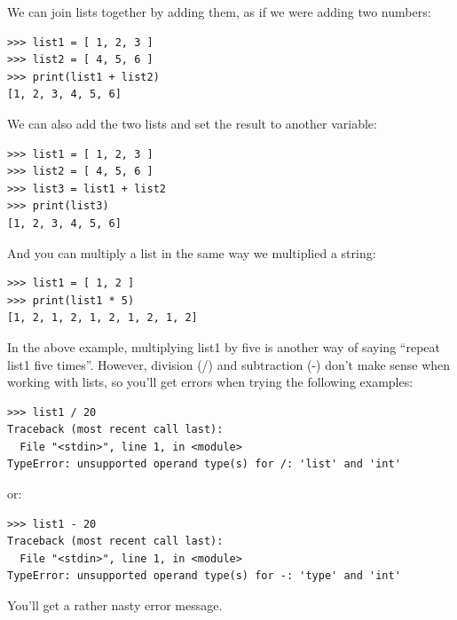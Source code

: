 We can join lists together by adding them, as if we were adding two numbers:

\begin{listing}
\begin{verbatim}
>>> list1 = [ 1, 2, 3 ]
>>> list2 = [ 4, 5, 6 ]
>>> print(list1 + list2)
[1, 2, 3, 4, 5, 6]
\end{verbatim}
\end{listing}

\noindent
We can also add the two lists and set the result to another variable:

\begin{listing}
\begin{verbatim}
>>> list1 = [ 1, 2, 3 ]
>>> list2 = [ 4, 5, 6 ]
>>> list3 = list1 + list2
>>> print(list3)
[1, 2, 3, 4, 5, 6]
\end{verbatim}
\end{listing}

\noindent
And you can multiply a list in the same way we multiplied a string:

\begin{listing}
\begin{verbatim}
>>> list1 = [ 1, 2 ]
>>> print(list1 * 5)
[1, 2, 1, 2, 1, 2, 1, 2, 1, 2]
\end{verbatim}
\end{listing}

\noindent
In the above example, multiplying list1 by five is another way of saying ``repeat list1 five times''. However, division (/) and subtraction (-) don't make sense when working with lists, so you'll get errors when trying the following examples:

\begin{listing}
\begin{verbatim}
>>> list1 / 20
Traceback (most recent call last):
  File "<stdin>", line 1, in <module>
TypeError: unsupported operand type(s) for /: 'list' and 'int'
\end{verbatim}
\end{listing}

\noindent
or:

\begin{listing}
\begin{verbatim}
>>> list1 - 20
Traceback (most recent call last):
  File "<stdin>", line 1, in <module>
TypeError: unsupported operand type(s) for -: 'type' and 'int'
\end{verbatim}
\end{listing}

\noindent
You'll get a rather nasty error message.

